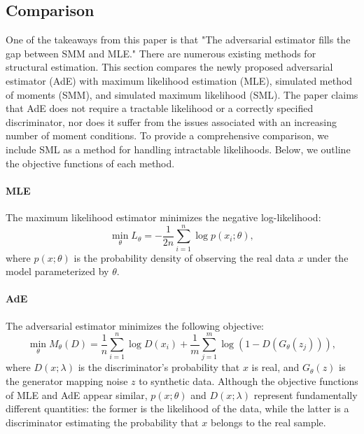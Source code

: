 \documentclass[12pt]{article}
\begin{document}
\subsection{Comparison} \label{subsec:comparison}

One of the takeaways from this paper is that "The adversarial estimator fills
the gap between SMM and MLE." There are numerous existing methods for
structural estimation. This section compares the newly proposed adversarial
estimator (AdE) with maximum likelihood estimation (MLE), simulated method of
moments (SMM), and simulated maximum likelihood (SML). The paper claims that
AdE does not require a tractable likelihood or a correctly specified
discriminator, nor does it suffer from the issues associated with an increasing
number of moment conditions. To provide a comprehensive comparison, we include
SML as a method for handling intractable likelihoods. Below, we outline the
objective functions of each method.

\paragraph{MLE}
The maximum likelihood estimator minimizes the negative log-likelihood:
\begin{equation*}
    \min_\theta L_\theta = -\frac{1}{2n} \sum_{i=1}^n \log p(x_i; \theta),
\end{equation*}
where \(p(x; \theta)\) is the probability density of observing the real data \(x\) under the model parameterized by \(\theta\).

\paragraph{AdE}
The adversarial estimator minimizes the following objective:
\begin{equation*}
    \min_\theta M_\theta(D) = \frac{1}{n} \sum_{i=1}^n \log D(x_i) + \frac{1}{m} \sum_{j=1}^m \log \left(1 - D(G_\theta(z_j))\right),
\end{equation*}
where \(D(x; \lambda)\) is the discriminator's probability that \(x\) is real, and \(G_\theta(z)\) is the generator mapping noise \(z\) to synthetic data. Although the objective functions of MLE and AdE appear similar, \(p(x; \theta)\) and \(D(x; \lambda)\) represent fundamentally different quantities: the former is the likelihood of the data, while the latter is a discriminator estimating the probability that \(x\) belongs to the real sample.
\end{document}
